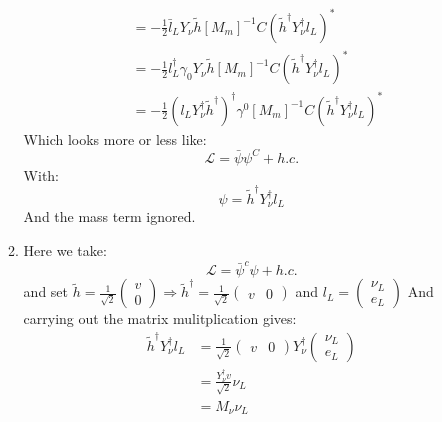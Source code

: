 \documentclass[12pt,a4]{article}
\begin{document}
\begin{enumerate}
\begin{enumerate}
\begin{align*}
                      &= - \frac{1}{2}\bar{l}_L Y_\nu \tilde{h}  [M_m ]^{-1} C\left(\tilde{h}^{\dagger} Y_\nu^{\dagger}  l_{L}\right)^* \\
                      &= - \frac{1}{2}l_L^\dagger\gamma_0 Y_\nu \tilde{h}  [M_m ]^{-1} C\left(\tilde{h}^{\dagger} Y_\nu^{\dagger}  l_{L}\right)^* \\
                      &= - \frac{1}{2}(l_L Y_\nu^\dagger \tilde{h}^\dagger)^\dagger \gamma^0  [M_m ]^{-1} C\left(\tilde{h}^{\dagger} Y_\nu^{\dagger}  l_{L}\right)^* 
        \end{align*}
        Which looks more or less like:
        \begin{equation*}
          \mathcal{L} = \bar{\psi} \psi^{C} + h.c.
        \end{equation*}
        With:
        \begin{equation*}
          \psi = \tilde{h}^\dagger Y^\dagger_\nu l_L
        \end{equation*}
        And the mass term ignored.
      \item
        Here we take:
        \begin{equation*}
          \mathcal{L} = \bar{\psi}^c \psi + h.c.
        \end{equation*}
        and set $\tilde{h} = \frac{1}{\sqrt{2}}\left(\begin{matrix} v\\ 0\end{matrix}\right) \Rightarrow \tilde{h}^\dagger = \frac{1}{\sqrt{2}}\left(\begin{matrix} v & 0\end{matrix}\right)$ and $l_L = \left(\begin{matrix} \nu_L\\ e_L\end{matrix}\right)$
        And carrying out the matrix mulitplication gives:
        \begin{align*}
          \tilde{h}^\dagger Y^\dagger_\nu l_L
               &=  \frac{1}{\sqrt{2}}\left(\begin{matrix} v & 0\end{matrix}\right) Y^\dagger_\nu \left(\begin{matrix} \nu_L\\ e_L\end{matrix}\right)\\
               &=  \frac{Y^\dagger_\nu v}{\sqrt{2}} \nu_L\\
               &=  M_\nu \nu_L
        \end{align*}

\end{enumerate}
\end{enumerate}
\end{document}
